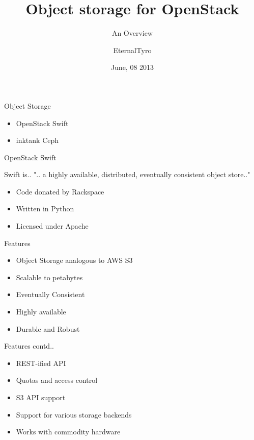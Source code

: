 \documentclass{beamer}
\title[Cloud storage systems]{Object storage for OpenStack}
\subtitle[Overview]{An Overview}
\author[EternalTyro]{EternalTyro}
\institute[A]{
      MOAIM\\
      Big City.\\[1ex]
      \texttt{myemail@mydomain.com}
}
\date{June, 08 2013}
\begin{document}
\begin{frame}[plain]
  \titlepage
\end{frame}

\begin{frame}{Object Storage}

\begin{itemize}
 \item OpenStack Swift
 \pause
 \item inktank Ceph
\end{itemize}
\end{frame}

\begin{frame}{OpenStack Swift}
\begin{definition}{Swift is..}
 ".. a highly available, distributed, eventually consistent object store.."
\end{definition}
\begin{itemize}
 \item Code donated by Rackspace
 \item Written in Python
 \item Licensed under Apache
\end{itemize}
\end{frame}

\begin{frame}{Features}
\begin{itemize}
 \item Object Storage analogous to AWS S3
 \pause
 \item Scalable to petabytes
 \pause
 \item Eventually Consistent
 \pause
 \item Highly available
 \pause
 \item Durable and Robust
\end{itemize}
\end{frame}

\begin{frame}{Features contd..}
\begin{itemize}
 \item REST-ified API
 \pause
 \item Quotas and access control
 \pause
 \item S3 API support
 \pause
 \item Support for various storage backends
 \pause
 \item Works with commodity hardware
\end{itemize}
\end{frame}
\end{document}
